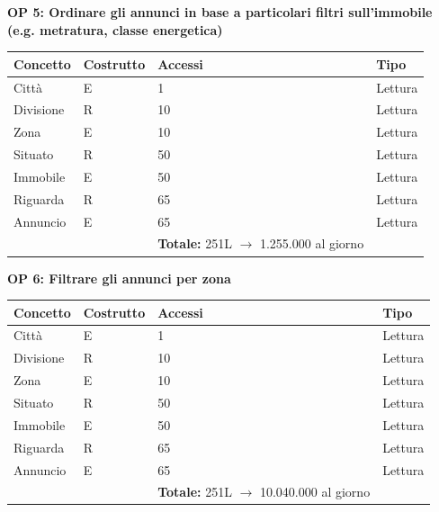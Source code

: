 \documentclass[a4paper,12pt]{report}
\begin{document}
            \textbf{OP 5: Ordinare gli annunci in base a particolari filtri sull'immobile (e.g. metratura, classe energetica)}
        	\begin{table}[H]
            \centering
             \begin{tabular}{llll}
             \rowcolor{yellow!20} \textbf{Concetto} & \textbf{Costrutto} & \textbf{Accessi} & \textbf{Tipo}\\ [0.5ex] 
             \hline
             Città & E & 1 & Lettura \\ 
             Divisione & R & 10 & Lettura \\ 
             Zona & E & 10 & Lettura \\ 
             Situato & R & 50 & Lettura \\ 
             Immobile & E & 50 & Lettura \\
             Riguarda & R & 65 & Lettura \\ 
             Annuncio & E & 65 & Lettura \\ 
             \hline
                \rowcolor{yellow!20} &   & \textbf{Totale:} 251L $\rightarrow$ 1.255.000 al giorno &  \\ [1ex] 
             
             \end{tabular}
            \end{table}

            \textbf{OP 6: Filtrare gli annunci per zona}
        	\begin{table}[H]
            \centering
             \begin{tabular}{llll}
             \rowcolor{yellow!20} \textbf{Concetto} & \textbf{Costrutto} & \textbf{Accessi} & \textbf{Tipo}\\ [0.5ex] 
             \hline
             Città & E & 1 & Lettura \\ 
             Divisione & R & 10 & Lettura \\ 
             Zona & E & 10 & Lettura \\ 
             Situato & R & 50 & Lettura \\ 
             Immobile & E & 50 & Lettura \\
             Riguarda & R & 65 & Lettura \\ 
             Annuncio & E & 65 & Lettura \\ 
             \hline
                \rowcolor{yellow!20} &   & \textbf{Totale:} 251L $\rightarrow$ 10.040.000 al giorno &  \\ [1ex] 
             
             \end{tabular}
            \end{table}
\end{document}
